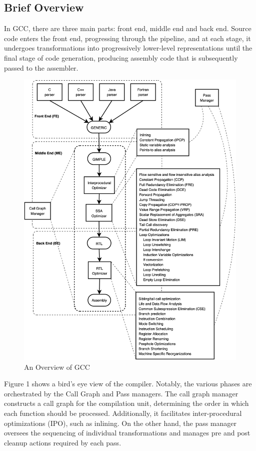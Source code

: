 \documentclass[conference]{IEEEtran}
\begin{document}
\subsection{Brief Overview}

In GCC, there are three main parts: front end, middle end and back end. Source code enters the front end, progressing through the pipeline, and at each stage, it undergoes transformations into progressively lower-level representations until the final stage of code generation, producing assembly code that is subsequently passed to the assembler.

\begin{figure}[htbp]
\centering
\includegraphics [width=0.95\linewidth]{pictures/GCCoverview.png}
\caption{An Overview of GCC\cite{b1}}
\label{fig1}
\end{figure}

Figure 1 shows a bird's eye view of the compiler. Notably, the various phases are orchestrated by the Call Graph and Pass managers. The call graph manager constructs a call graph for the compilation unit, determining the order in which each function should be processed. Additionally, it facilitates inter-procedural optimizations (IPO), such as inlining. On the other hand, the pass manager oversees the sequencing of individual transformations and manages pre and post cleanup actions required by each pass.
\end{document}
